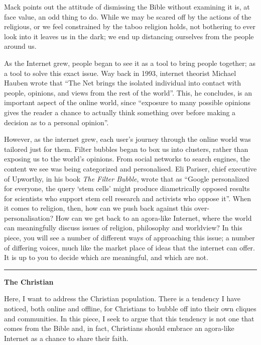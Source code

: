 \documentclass[]{article}
\begin{document}
Mack points out the attitude of dismissing the Bible without examining
it is, at face value, an odd thing to do. While we may be scared off by
the actions of the religious, or we feel constrained by the taboo
religion holds, not bothering to ever look into it leaves us in the
dark; we end up distancing ourselves from the people around us.

As the Internet grew, people began to see it as a tool to bring people
together; as a tool to solve this exact issue. Way back in 1993,
internet theorist Michael Hauben wrote that ``The Net brings the
isolated individual into contact with people, opinions, and views from
the rest of the world''\autocite{HaubenNetNetizensImpact1993}. This, he
concludes, is an important aspect of the online world, since ``exposure
to many possible opinions gives the reader a chance to actually think
something over before making a decision as to a personal
opinion''\autocite{HaubenNetNetizensImpact1993}.

However, as the internet grew, each user's journey through the online
world was tailored just for them. Filter bubbles began to box us into
clusters, rather than exposing us to the world's opinions. From social
networks to search engines, the content we see was being categorized and
personalised. Eli Pariser, chief executive of Upworthy, in his book
\emph{The Filter Bubble}, wrote that as ``Google personalized for
everyone, the query `stem cells' might produce diametrically opposed
results for scientists who support stem cell research and activists who
oppose it''\autocite[pg 2]{PariserFilterBubblewhat2012}. When it comes
to religion, then, how can we push back against this
over-personalisation? How can we get back to an agora-like Internet,
where the world can meaningfully discuss issues of religion, philosophy
and worldview? In this piece, you will see a number of different ways of
approaching this issue; a number of differing voices, much like the
market place of ideas that the internet can offer. It is up to you to
decide which are meaningful, and which are not.

\begin{center}\rule{0.5\linewidth}{\linethickness}\end{center}

\textbf{The Christian}

Here, I want to address the Christian population. There is a tendency I
have noticed, both online and offline, for Christians to bubble off into
their own cliques and communities. In this piece, I seek to argue that
this tendency is not one that comes from the Bible and, in fact,
Christians should embrace an agora-like Internet as a chance to share
their faith.
\end{document}
